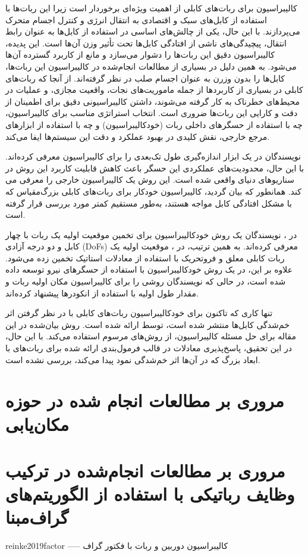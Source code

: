  کالیبراسیون برای ربات‌های کابلی از اهمیت ویژه‌ای برخوردار است زیرا این ربات‌ها با استفاده از کابل‌های سبک و اقتصادی به انتقال انرژی و کنترل اجسام متحرک می‌پردازند. با این حال، یکی از چالش‌های اساسی در استفاده از کابل‌ها به عنوان رابط انتقال، پیچیدگی‌های ناشی از افتادگی کابل‌ها تحت تأثیر وزن آن‌ها است. این پدیده، کالیبراسیون دقیق این ربات‌ها را دشوار می‌سازد و مانع از کاربرد گسترده آن‌ها می‌شود. به همین دلیل در بسیاری از مطالعات انجام‌شده در کالیبراسیون این ربات‌ها، کابل‌ها را بدون وزرن به عنوان اجسام صلب در نظر گرفته‌اند. از آنجا که ربات‌های کابلی در بسیاری از کاربردها از جمله ماموریت‌های نجات، واقعیت مجازی، و عملیات در محیط‌های خطرناک به کار گرفته می‌شوند، داشتن کالیبراسیونی دقیق برای اطمینان از دقت و کارایی این ربات‌ها ضروری است. انتخاب استراتژی مناسب برای کالیبراسیون، چه با استفاده از حسگرهای داخلی ربات (خودکالیبراسیون) و چه با استفاده از ابزارهای مرجع خارجی، نقش کلیدی در بهبود عملکرد و دقت این سیستم‌ها ایفا می‌کند. 
 
نویسندگان در \cite{jin2018geometric} یک ابزار اندازه‌گیری طول تک‌بعدی را برای کالیبراسیون معرفی کرده‌اند. با این حال، محدودیت‌های عملکردی این حسگر باعث کاهش قابلیت کاربرد این روش در سناریوهای دنیای واقعی شده است. این روش یک کالیبراسیون خارجی را معرفی می کند. همانطور که بیان گردید، کالیبراسیون خودکار برای ربات‌های کابلی بزرگ‌مقیاس که با مشکل افتادگی کابل مواجه هستند، به‌طور مستقیم کمتر مورد بررسی قرار گرفته است. 

در \cite{borgstrom2009nims}، نویسندگان یک روش خودکالیبراسیون برای تخمین موقعیت اولیه یک ربات با چهار کابل و دو درجه آزادی (DoFs) معرفی کرده‌اند. به همین ترتیب، در \cite{ida2019automatic}، موقعیت اولیه یک ربات کابلی معلق و فروتحریک با استفاده از معادلات استاتیک تخمین زده می‌شود. علاوه بر این، در \cite{pott2013cable_ForceSensorCalib} یک روش خودکالیبراسیون با استفاده از حسگرهای نیرو توسعه داده شده است، در حالی که نویسندگان \cite{darvin2018initial} روشی را برای کالیبراسیون مکان اولیه ربات و مقدار طول اولیه با استفاده از انکودرها پیشنهاد کرده‌اند. 
 
تنها کاری که تاکنون برای خودکالیبراسیون ربات‌های کابلی با در نظر گرفتن اثر خم‌شدگی کابل‌ها منتشر شده است، توسط \cite{an2022all} ارائه شده است. روش بیان‌شده در این مقاله برای حل مسئله کالیبراسیون، از روش‌های مرسوم استفاده می‌کند. با این حال، در این تحقیق، پاسخ‌پذیری معادلات در قالب فرمول‌بندی ارائه شده برای ربات‌های با ابعاد بزرگ که در آن‌ها اثر خم‌شدگی نمود پیدا می‌کند، بررسی نشده است.


\section{مروری بر مطالعات انجام شده در حوزه مکان‌یابی} 





\section{مروری بر مطالعات انجام‌شده در ترکیب وظایف رباتیکی با استفاده از الگوریتم‌های گراف‌مبنا} 

reinke2019factor ----- کالیبراسیون دوربین و ربات با فکتور گراف
